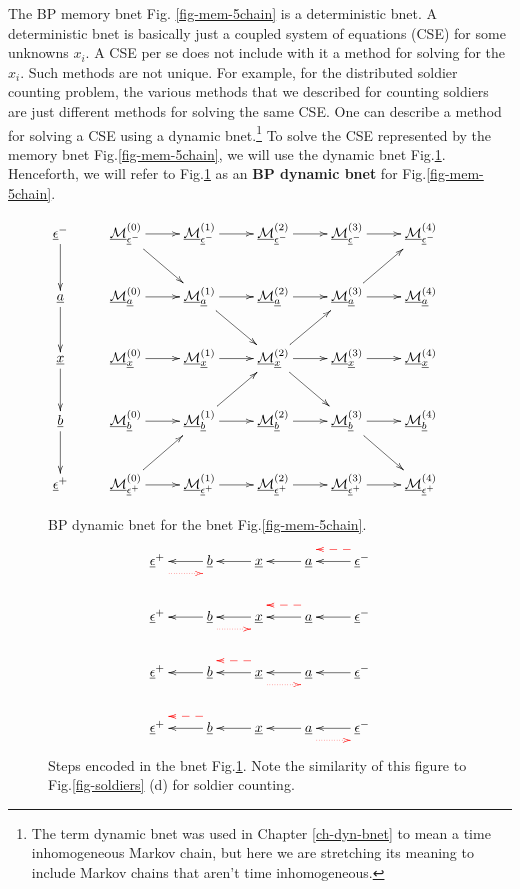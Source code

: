 The BP memory bnet
 Fig.
\ref{fig-mem-5chain}
is a deterministic bnet.
A deterministic bnet
is basically
just a coupled system
of equations (CSE)
for some unknowns $x_i$. 
A CSE per se does not
include with it a method for  
solving for the $x_i$. Such methods are not
unique.
For example,
for the 
distributed
soldier counting 
problem,
the various 
methods that
we described
for counting soldiers
are just different
methods 
for solving the same
CSE.
One can describe 
a method for solving a
CSE using a dynamic
bnet.\footnote{
The term
dynamic bnet
was used in Chapter \ref{ch-dyn-bnet}
to mean a time inhomogeneous
Markov chain, but 
here we are stretching its meaning to
include
Markov chains
that aren't 
time inhomogeneous.}
To solve
the CSE
represented by
the memory bnet Fig.\ref{fig-mem-5chain},
we will use the 
dynamic bnet 
Fig.\ref{fig-propagation-5chain}.
Henceforth, 
we will refer to
Fig.\ref{fig-propagation-5chain} as
an {\bf BP dynamic bnet}
for Fig.\ref{fig-mem-5chain}.

\begin{figure}
$$\xymatrix{
\rveps^-\ar[d]
&\ucalm^{(0)}_{\rveps^-}\ar[r]\ar[dr]
&\ucalm^{(1)}_{\rveps^-}\ar[r]
&\ucalm^{(2)}_{\rveps^-}\ar[r]
&\ucalm^{(3)}_{\rveps^-}\ar[r]
&\ucalm^{(4)}_{\rveps^-}
&
\\
\rva\ar[d]
&\ucalm^{(0)}_{\rva}\ar[r]
&\ucalm^{(1)}_{\rva}\ar[r]\ar[dr]
&\ucalm^{(2)}_{\rva}\ar[r]
&\ucalm^{(3)}_{\rva}\ar[r]\ar[ur]
&\ucalm^{(4)}_{\rva}
\\
\rvx\ar[d]
&\ucalm^{(0)}_{\rvx}\ar[r]
&\ucalm^{(1)}_{\rvx}\ar[r]
&\ucalm^{(2)}_{\rvx}\ar[r]\ar[dr]\ar[ur]
&\ucalm^{(3)}_{\rvx}\ar[r]
&\ucalm^{(4)}_{\rvx}
\\
\rvb\ar[d]
&\ucalm^{(0)}_{\rvb}\ar[r]
&\ucalm^{(1)}_{\rvb}\ar[r]\ar[ur]
&\ucalm^{(2)}_{\rvb}\ar[r]
&\ucalm^{(3)}_{\rvb}\ar[r]\ar[dr]
&\ucalm^{(4)}_{\rvb}
\\
\rveps^+
&\ucalm^{(0)}_{\rveps^+}\ar[r]\ar[ur]
&\ucalm^{(1)}_{\rveps^+}\ar[r]
&\ucalm^{(2)}_{\rveps^+}\ar[r]
&\ucalm^{(3)}_{\rveps^+}\ar[r]
&\ucalm^{(4)}_{\rveps^+}
}$$
\caption{BP dynamic bnet for the bnet
  Fig.\ref{fig-mem-5chain}.}
\label{fig-propagation-5chain}
\end{figure}

\begin{figure}[h!]
$$
\xymatrix{
\rveps^+\ar@[red]@{.>}@<-2ex>[r]
&\rvb\ar[l]
&\rvx\ar[l]
&\rva\ar[l]
&\rveps^-\ar[l]\ar@[red]@{-->}@<-2ex>[l]
\\
\rveps^+
&\rvb\ar[l]\ar@[red]@{.>}@<-2ex>[r]
&\rvx\ar[l]
&\rva\ar[l]\ar@[red]@{-->}@<-2ex>[l]
&\rveps^-\ar[l]
\\
\rveps^+
&\rvb\ar[l]
&\rvx\ar[l]\ar@[red]@{.>}@<-2ex>[r]
\ar@[red]@{-->}@<-2ex>[l]
&\rva\ar[l]
&\rveps^-\ar[l]
\\
\rveps^+
&\rvb\ar[l]\ar@[red]@{-->}@<-2ex>[l]
&\rvx\ar[l]
&\rva\ar[l]\ar@[red]@{.>}@<-2ex>[r]
&\rveps^-\ar[l]
}$$
\caption{
Steps encoded in the 
bnet 
Fig.\ref{fig-propagation-5chain}.
Note the 
similarity 
of this figure 
to Fig.\ref{fig-soldiers} (d)
for soldier counting.
} 
\label{fig-multiframe-5chain}
\end{figure}

